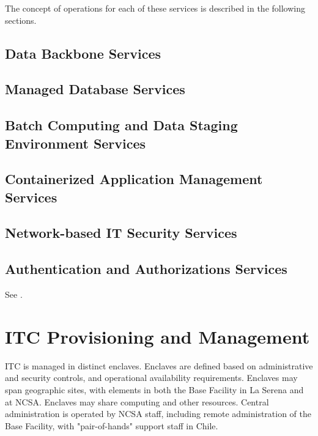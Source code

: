 The concept of operations for each of these services is described in the
following sections.

\subsection{Data Backbone Services}


\subsection{Managed Database Services}


\subsection{Batch Computing and Data Staging Environment Services}


\subsection{Containerized Application Management Services}


\subsection{Network-based IT Security Services}


\subsection{Authentication and Authorizations Services}
See .

\section{ITC Provisioning and Management}

ITC is managed in distinct enclaves. Enclaves are defined based on administrative
and security controls, and operational availability requirements. Enclaves may
span geographic sites, with elements in both the Base Facility in La Serena and
at NCSA. Enclaves may share computing and other resources. Central administration
is operated by NCSA staff, including remote administration of the Base Facility,
with "pair-of-hands" support staff in Chile.

